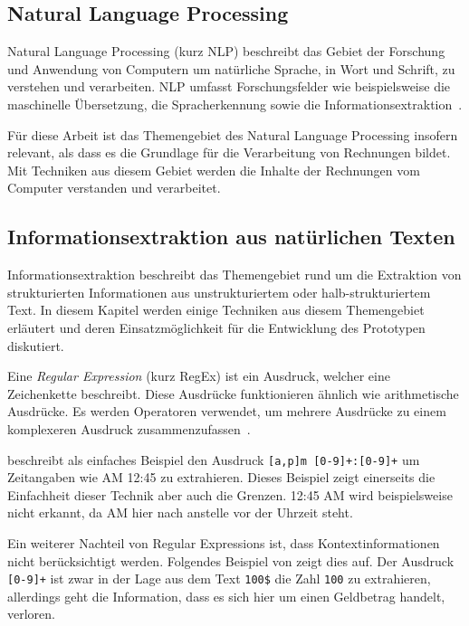\subsection{Natural Language Processing}

Natural Language Processing (kurz NLP) beschreibt das Gebiet der Forschung und Anwendung von Computern um natürliche Sprache, in Wort und Schrift, zu verstehen und verarbeiten. NLP umfasst Forschungsfelder wie beispielsweise die maschinelle Übersetzung, die Spracherkennung sowie die Informationsextraktion~\autocite{Chowdhury2003}. 

Für diese Arbeit ist das Themengebiet des Natural Language Processing insofern relevant, als dass es die Grundlage für die Verarbeitung von Rechnungen bildet. Mit Techniken aus diesem Gebiet werden die Inhalte der Rechnungen vom Computer verstanden und verarbeitet.

\subsection{Informationsextraktion aus natürlichen Texten}
\label{chap:ner}


Informationsextraktion beschreibt das Themengebiet rund um die Extraktion von strukturierten Informationen aus unstrukturiertem oder halb-strukturiertem Text. In diesem Kapitel werden einige Techniken aus diesem Themengebiet erläutert und deren Ein\-satz\-mög\-lich\-keit für die Entwicklung des Prototypen diskutiert.

Eine \textit{Regular Expression} (kurz RegEx) ist ein Ausdruck, welcher eine Zeichenkette beschreibt. Diese Ausdrücke funktionieren ähnlich wie arithmetische Ausdrücke. Es werden Operatoren verwendet, um mehrere Ausdrücke zu einem komplexeren Ausdruck zusammenzufassen~\autocite{Xiao2004}.

\textcite{Xiao2004} beschreibt als einfaches Beispiel den Ausdruck \texttt{[a,p]m [0-9]+:[0-9]+} um Zeitangaben wie AM 12:45 zu extrahieren. Dieses Beispiel zeigt einerseits die Einfachheit dieser Technik aber auch die Grenzen. 12:45 AM wird beispielsweise nicht erkannt, da AM hier nach anstelle vor der Uhrzeit steht. 

Ein weiterer Nachteil von Regular Expressions ist, dass Kontextinformationen nicht be\-rück\-sich\-tigt werden. Folgendes Beispiel von \textcite{Xiao2004} zeigt dies auf. Der Ausdruck \texttt{[0-9]+} ist zwar in der Lage aus dem Text \texttt{100\$} die Zahl \texttt{100} zu extrahieren, allerdings geht die Information, dass es sich hier um einen Geldbetrag handelt, verloren.

